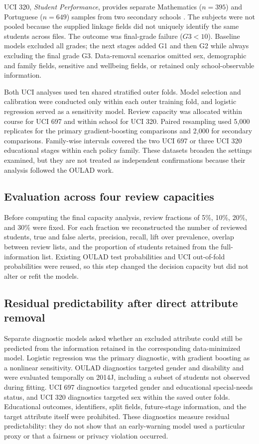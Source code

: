 \documentclass[education,article,submit,moreauthors]{Definitions/mdpi}
\begin{document}
UCI 320, \emph{Student Performance}, provides separate Mathematics ($n=395$) and Portuguese ($n=649$) samples from two secondary schools \citep{cortez2008uci320}. The subjects were not pooled because the supplied linkage fields did not uniquely identify the same students across files. The outcome was final-grade failure ($G3<10$). Baseline models excluded all grades; the next stages added G1 and then G2 while always excluding the final grade G3. Data-removal scenarios omitted sex, demographic and family fields, sensitive and wellbeing fields, or retained only school-observable information.

Both UCI analyses used ten shared stratified outer folds. Model selection and calibration were conducted only within each outer training fold, and logistic regression served as a sensitivity model. Review capacity was allocated within course for UCI 697 and within school for UCI 320. Paired resampling used 5,000 replicates for the primary gradient-boosting comparisons and 2,000 for secondary comparisons. Family-wise intervals covered the two UCI 697 or three UCI 320 educational stages within each policy family. These datasets broaden the settings examined, but they are not treated as independent confirmations because their analysis followed the OULAD work.

\subsection{Evaluation across four review capacities}

Before computing the final capacity analysis, review fractions of 5\%, 10\%, 20\%, and 30\% were fixed. For each fraction we reconstructed the number of reviewed students, true and false alerts, precision, recall, lift over prevalence, overlap between review lists, and the proportion of students retained from the full-information list. Existing OULAD test probabilities and UCI out-of-fold probabilities were reused, so this step changed the decision capacity but did not alter or refit the models.

\subsection{Residual predictability after direct attribute removal}

Separate diagnostic models asked whether an excluded attribute could still be predicted from the information retained in the corresponding data-minimized model. Logistic regression was the primary diagnostic, with gradient boosting as a nonlinear sensitivity. OULAD diagnostics targeted gender and disability and were evaluated temporally on 2014J, including a subset of students not observed during fitting. UCI 697 diagnostics targeted gender and educational special-needs status, and UCI 320 diagnostics targeted sex within the saved outer folds. Educational outcomes, identifiers, split fields, future-stage information, and the target attribute itself were prohibited. These diagnostics measure residual predictability: they do not show that an early-warning model used a particular proxy or that a fairness or privacy violation occurred.
\end{document}
